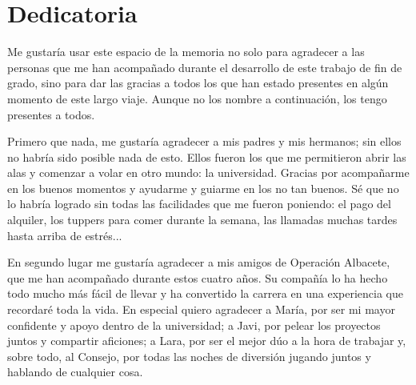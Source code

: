 \documentclass[12pt]{report} %
\renewcommand{\_}{\oldunderscore\allowbreak}
\begin{document}
\begin{abstract}
Los resultados muestran que algunos modelos modifican su respuesta cuando la consulta incluye una referencia explícita a la discapacidad. Las diferencias aparecen principalmente en el tono, en la presencia de estereotipos y en la forma de presentar la información, especialmente en los modelos locales, en las discapacidades cognitivas e intelectuales y en el dominio de empleo. Además, el pipeline desarrollado puede reutilizarse para futuras evaluaciones con otros modelos, datasets o métricas.

	\textbf{Palabras clave: }sesgos en IA, modelos de lenguaje, discapacidad, prompts contrafactuales, evaluación automática, español, análisis de sentimiento, LLM-as-judge.

	
	\vfill
\end{abstract}
	\newpage %
	\thispagestyle{empty}
	\mbox{}


\chapter*{Dedicatoria} %
Me gustaría usar este espacio de la memoria no solo para agradecer a las personas que me han acompañado durante el desarrollo de este trabajo de fin de grado, sino para dar las gracias a todos los que han estado presentes en algún momento de este largo viaje. Aunque no los nombre a continuación, los tengo presentes a todos.

Primero que nada, me gustaría agradecer a mis padres y mis hermanos; sin ellos no habría sido posible nada de esto. Ellos fueron los que me permitieron abrir las alas y comenzar a volar en otro mundo: la universidad. Gracias por acompañarme en los buenos momentos y ayudarme y guiarme en los no tan buenos. Sé que no lo habría logrado sin todas las facilidades que me fueron poniendo: el pago del alquiler, los tuppers para comer durante la semana, las llamadas muchas tardes hasta arriba de estrés...

En segundo lugar me gustaría agradecer a mis amigos de Operación Albacete, que me han acompañado durante estos cuatro años. Su compañía lo ha hecho todo mucho más fácil de llevar y ha convertido la carrera en una experiencia que recordaré toda la vida. En especial quiero agradecer a María, por ser mi mayor confidente y apoyo dentro de la universidad; a Javi, por pelear los proyectos juntos y compartir aficiones; a Lara, por ser el mejor dúo a la hora de trabajar y, sobre todo, al Consejo, por todas las noches de diversión jugando juntos y hablando de cualquier cosa.
\end{document}
